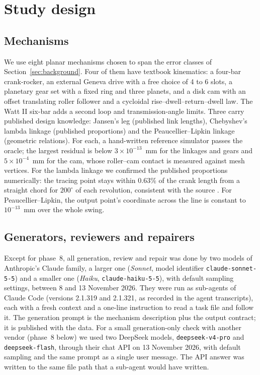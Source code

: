 \section{Study design}\label{sec:design}

\subsection{Mechanisms}
We use eight planar mechanisms chosen to span the error classes of Section~\ref{sec:background}. Four of them have textbook kinematics: a four-bar crank-rocker, an external Geneva drive with a free choice of 4 to 6 slots, a planetary gear set with a fixed ring and three planets, and a disk cam with an offset translating roller follower and a cycloidal rise--dwell--return--dwell law. The Watt II six-bar adds a second loop and transmission-angle limits. Three carry published design knowledge: Jansen's leg (published link lengths), Chebyshev's lambda linkage (published proportions) and the Peaucellier--Lipkin linkage (geometric relations). For each, a hand-written reference simulator passes the oracle; the largest residual is below $3\times10^{-13}$~mm for the linkages and gears and $5\times10^{-4}$~mm for the cam, whose roller--cam contact is measured against mesh vertices. For the lambda linkage we confirmed the published proportions numerically: the tracing point stays within 0.63\% of the crank length from a straight chord for $200^\circ$ of each revolution, consistent with the source \cite{wiki_lambda}. For Peaucellier--Lipkin, the output point's coordinate across the line is constant to $10^{-13}$~mm over the whole swing.

\subsection{Generators, reviewers and repairers}
Except for phase~8, all generation, review and repair was done by two models of Anthropic's Claude family, a larger one (\emph{Sonnet}, model identifier \texttt{claude-sonnet-5-5}) and a smaller one (\emph{Haiku}, \texttt{claude-haiku-5-5}), with default sampling settings, between 8 and 13 November 2026. They were run as sub-agents of Claude Code (versions 2.1.319 and 2.1.321, as recorded in the agent transcripts), each with a fresh context and a one-line instruction to read a task file and follow it. The generation prompt is the mechanism description plus the output contract; it is published with the data. For a small generation-only check with another vendor (phase~8 below) we used two DeepSeek models, \texttt{deepseek-v4-pro} and \texttt{deepseek-flash}, through their chat API on 13 November 2026, with default sampling and the same prompt as a single user message. The API answer was written to the same file path that a sub-agent would have written.

